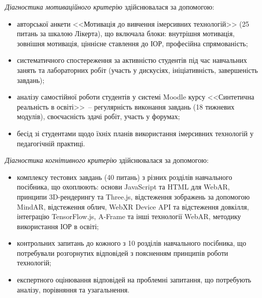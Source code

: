 \textit{Діагностика мотиваційного критерію} здійснювалася за допомогою:
\begin{itemize}
\item авторської анкети <<Мотивація до вивчення імерсивних технологій>> (25 питань за шкалою Лікерта), що включала блоки: внутрішня мотивація, зовнішня мотивація, ціннісне ставлення до ІОР, професійна спрямованість;
\item систематичного спостереження за активністю студентів під час навчальних занять та лабораторних робіт (участь у дискусіях, ініціативність, завершеність завдань);
\item аналізу самостійної роботи студентів у системі Moodle курсу <<Синтетична реальність в освіті>>~-- регулярність виконання завдань (18 тижневих модулів), своєчасність здачі робіт, участь у форумах;
\item бесід зі студентами щодо їхніх планів використання імерсивних технологій у педагогічній практиці.
\end{itemize}

\textit{Діагностика когнітивного критерію} здійснювалася за допомогою:
\begin{itemize}
\item комплексу тестових завдань (40 питань) з різних розділів навчального посібника, що охоплюють: основи JavaScript та HTML для WebAR, принципи 3D-рендерингу та Three.js, відстеження зображень за допомогою MindAR, відстеження облич, WebXR Device API та відстеження довкілля, інтеграцію TensorFlow.js, A-Frame та інші технології WebAR, методику використання ІОР в освіті;
\item контрольних запитань до кожного з 10 розділів навчального посібника, що потребували розгорнутих відповідей з поясненням принципів роботи технологій;
\item експертного оцінювання відповідей на проблемні запитання, що потребують аналізу, порівняння та узагальнення.
\end{itemize}

